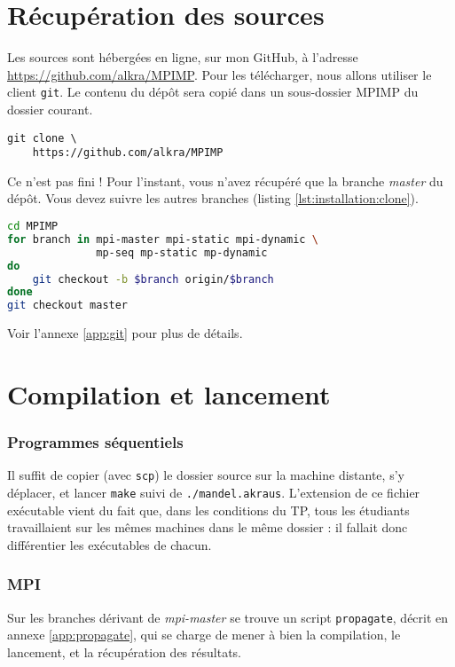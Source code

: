 \section{Récupération des sources}

Les sources sont hébergées en ligne, sur mon GitHub, à l'adresse
\url{https://github.com/alkra/MPIMP}. Pour les télécharger, nous
allons utiliser le client \texttt{git}. Le contenu du dépôt sera copié
dans un sous-dossier MPIMP du dossier courant.

\begin{verbatim}
git clone \
    https://github.com/alkra/MPIMP
\end{verbatim}

Ce n'est pas fini ! Pour l'instant, vous n'avez récupéré que la
branche \emph{master} du dépôt. Vous devez suivre les autres
branches (listing \ref{lst:installation:clone}).

\begin{lstlisting}[float=*, language=bash, caption=Copie du dépôt,
  label=lst:installation:clone]
cd MPIMP
for branch in mpi-master mpi-static mpi-dynamic \
              mp-seq mp-static mp-dynamic
do
    git checkout -b $branch origin/$branch
done
git checkout master
\end{lstlisting}

Voir l'annexe \ref{app:git} pour plus de détails.



\section{Compilation et lancement}

\subsubsection{Programmes séquentiels}

Il suffit de copier (avec \texttt{scp}) le dossier source sur la
machine distante, s'y déplacer, et lancer \texttt{make} suivi de
\texttt{./mandel.akraus}. L'extension de ce fichier exécutable vient
du fait que, dans les conditions du TP, tous les étudiants
travaillaient sur les mêmes machines dans le même dossier : il fallait
donc différentier les exécutables de chacun.

\subsubsection{MPI}

Sur les branches dérivant de \emph{mpi-master} se trouve un script
\texttt{propagate}, décrit en annexe \ref{app:propagate}, qui se
charge de mener à bien la compilation, le lancement, et la
récupération des résultats.

